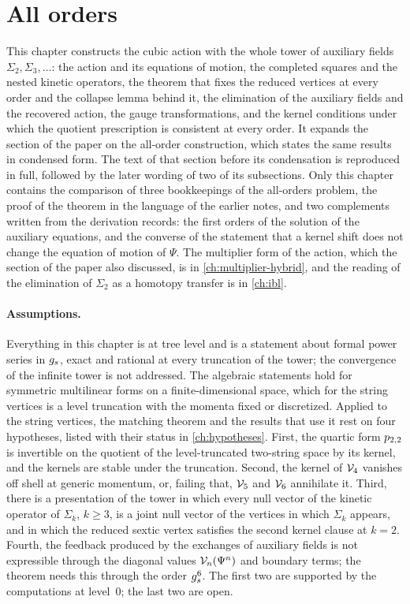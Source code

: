\section{All orders}
\label{ch:all-orders}

This chapter constructs the cubic action with the whole tower of auxiliary fields $\Sigma_2, \Sigma_3, \ldots$: the action and its equations of motion, the completed squares and the nested kinetic operators, the theorem that fixes the reduced vertices at every order and the collapse lemma behind it, the elimination of the auxiliary fields and the recovered action, the gauge transformations, and the kernel conditions under which the quotient prescription is consistent at every order.
It expands the section of the paper on the all-order construction, which states the same results in condensed form.
The text of that section before its condensation is reproduced in full, followed by the later wording of two of its subsections.
Only this chapter contains the comparison of three bookkeepings of the all-orders problem, the proof of the theorem in the language of the earlier notes, and two complements written from the derivation records: the first orders of the solution of the auxiliary equations, and the converse of the statement that a kernel shift does not change the equation of motion of $\Psi$.
The multiplier form of the action, which the section of the paper also discussed, is in \cref{ch:multiplier-hybrid}, and the reading of the elimination of $\Sigma_2$ as a homotopy transfer is in \cref{ch:ibl}.

\paragraph{Assumptions.}

Everything in this chapter is at tree level and is a statement about formal power series in $g_s$, exact and rational at every truncation of the tower; the convergence of the infinite tower is not addressed.
The algebraic statements hold for symmetric multilinear forms on a finite-dimensional space, which for the string vertices is a level truncation with the momenta fixed or discretized.
Applied to the string vertices, the matching theorem and the results that use it rest on four hypotheses, listed with their status in \cref{ch:hypotheses}.
First, the quartic form $p_{2,2}$ is invertible on the quotient of the level-truncated two-string space by its kernel, and the kernels are stable under the truncation.
Second, the kernel of $\mathcal{V}_{4}$ vanishes off shell at generic momentum, or, failing that, $\mathcal{V}_{5}$ and $\mathcal{V}_{6}$ annihilate it.
Third, there is a presentation of the tower in which every null vector of the kinetic operator of $\Sigma_k$, $k \ge 3$, is a joint null vector of the vertices in which $\Sigma_k$ appears, and in which the reduced sextic vertex satisfies the second kernel clause at $k = 2$.
Fourth, the feedback produced by the exchanges of auxiliary fields is not expressible through the diagonal values $\mathcal{V}_{n}(\Psi^n)$ and boundary terms; the theorem needs this through the order $g_s^6$.
The first two are supported by the computations at level~0; the last two are open.

